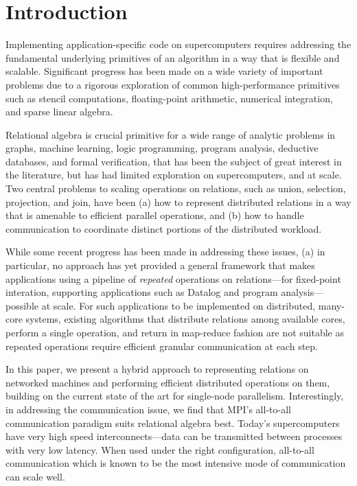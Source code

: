 

\section{Introduction}
\label{sec:intro}
%
Implementing application-specific code on supercomputers requires addressing the fundamental underlying primitives of an algorithm in a way that is flexible and scalable. Significant progress has been made on a wide variety of important problems due to a rigorous exploration of common high-performance primitives such as stencil computations, floating-point arithmetic, numerical integration, and sparse linear algebra. 

Relational algebra is crucial primitive for a wide range of analytic problems in graphs, machine learning, logic programming, program analysis, deductive databases, and formal verification, that has been the subject of great interest in the literature, but has had limited exploration on supercomputers, and at scale. Two central problems to scaling operations on relations, such as union, selection, projection, and join, have been (a) how to represent distributed relations in a way that is amenable to efficient parallel operations, and (b) how to handle communication to coordinate distinct portions of the distributed workload.

While some recent progress has been made in addressing these issues, (a) in particular, no approach has yet provided a general framework that makes applications using a pipeline of \emph{repeated} operations on relations---for fixed-point interation, supporting applications such as Datalog and program analysis---possible at scale. For such applications to be implemented on distributed, many-core systems, existing algorithms that distribute relations among available cores, perform a single operation, and return in map-reduce fashion are not suitable as repeated operations require efficient granular communication at each step. 

In this paper, we present a hybrid approach to representing relations on networked machines and performing efficient distributed operations on them, building on the current state of the art for single-node parallelism. Interestingly, in addressing the communication issue, we find that MPI's all-to-all communication paradigm suits relational algebra best. Today's supercomputers have very high speed interconnects---data can be transmitted between processes with very low latency. When used under the right configuration, all-to-all communication which is known to be the most intensive mode of communication can scale well.


